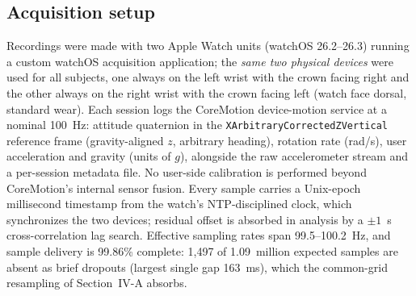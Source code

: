 \documentclass[conference]{IEEEtran}
\begin{document}
\subsection{Acquisition setup}
Recordings were made with two Apple Watch units (watchOS
26.2--26.3) running a custom watchOS acquisition application; the
\emph{same two physical devices} were used for all subjects, one
always on the left wrist with the crown facing right and the other
always on the right wrist with the crown facing left (watch face
dorsal, standard wear). Each session logs the CoreMotion device-motion
service at a nominal 100~Hz: attitude quaternion in the
\texttt{XArbitraryCorrectedZVertical} reference frame (gravity-aligned
$z$, arbitrary heading), rotation rate (rad/s), user acceleration and
gravity (units of $g$), alongside the raw accelerometer stream and a
per-session metadata file. No user-side calibration is performed
beyond CoreMotion's internal sensor fusion. Every sample carries a
Unix-epoch millisecond timestamp from the watch's NTP-disciplined
clock, which synchronizes the two devices; residual offset is absorbed
in analysis by a $\pm1$~s cross-correlation lag search. Effective
sampling rates span 99.5--100.2~Hz, and sample delivery is 99.86\%
complete: 1{,}497 of 1.09~million expected samples are absent as brief
dropouts (largest single gap 163~ms), which the common-grid resampling
of Section~IV-A absorbs.
\end{document}
